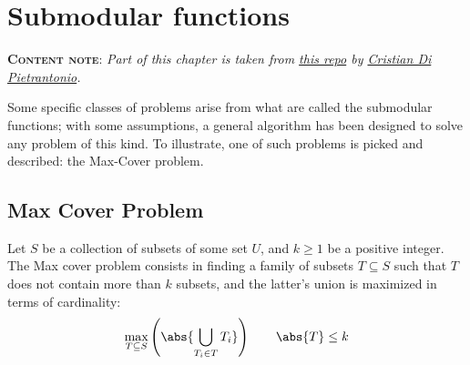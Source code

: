 \chapter{Submodular functions}

\textbf{\textsc{Content note}}: \emph{Part of this chapter is taken from \href{https://github.com/Halolegend94/uni_social_behavioral_networks/blob/master/chapters/ch03-submodular.tex}{this repo} by \href{https://github.com/Halolegend94}{Cristian Di Pietrantonio}.}
\vspace{2ex}

Some specific classes of problems arise from what are called the submodular functions; with some assumptions, a general algorithm has been designed to solve any problem of this kind. To illustrate, one of such problems is picked and described: the Max-Cover problem.

\section{Max Cover Problem}\label{sec:max-cover}

\begin{definition}\label{max-cover}
    Let $S$ be a collection of subsets of some set $U$, and $k \geq 1$ be a positive integer. The Max cover problem consists in finding a family of subsets $T \subseteq S$ such that $T$ does not contain more than $k$ subsets, and the latter's union is maximized in terms of cardinality:
    \begin{equation}\label{eq:coverage}
        \max_{T \subseteq S} \left( \abs{\bigcup_{T_i \in T} T_i} \right) \qquad \abs{T} \leq k
    \end{equation}
\end{definition}

